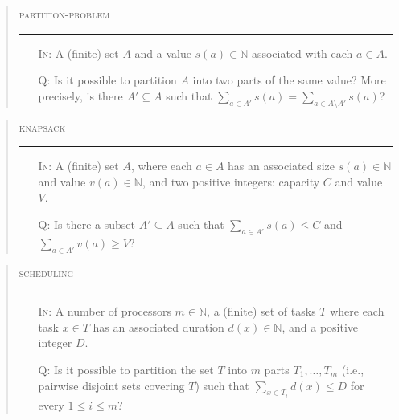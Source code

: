 \documentclass[a4paper,12pt]{amsart}
\begin{document}
        \bigskip
        \begin{quote}
        \begin{mdframed}
        \textsc{partition-problem}
        \medskip\hrule\medskip
        \begin{itemize}
            \item[\textsc{In:}] A (finite) set $A$ and a value $s(a)\in\mathbb N$ associated with each $a\in A$.
            \item[\textsc{Q:}] Is it possible to partition $A$ into two parts of the same value? More precisely, is there $A'\subseteq A$ such that $\sum_{a\in A'} s(a)=\sum_{a\in A\setminus A'} s(a)$?
        \end{itemize}
        \end{mdframed}
        \end{quote}
        
        
        \bigskip
        \begin{quote}
        \begin{mdframed}
        \textsc{knapsack}
        \medskip\hrule\medskip
        \begin{itemize}
            \item[\textsc{In:}] A (finite) set $A$, where each $a\in A$ has an associated size $s(a)\in\mathbb N$ and value $v(a)\in\mathbb N$, and two positive integers: capacity $C$ and value $V$.
            \item[\textsc{Q:}] Is there a subset $A'\subseteq A$ such that $\sum_{a\in A'} s(a)\leq C$ and $\sum_{a\in A'} v(a)\geq V$?
        \end{itemize}
        \end{mdframed}
        \end{quote}
        
        
        \bigskip
        \begin{quote}
        \begin{mdframed}
        \textsc{scheduling}
        \medskip\hrule\medskip
        \begin{itemize}
            \item[\textsc{In:}] A number of processors $m\in\mathbb N$, a (finite) set of tasks $T$ where each task $x\in T$ has an associated duration $d(x)\in\mathbb N$, and a positive integer $D$.
            \item[\textsc{Q:}] Is it possible to partition the set $T$ into $m$ parts $T_1,\dots,T_m$ (i.e., pairwise disjoint sets covering $T$) such that $\sum_{x\in T_i} d(x)\leq D$ for every $1\leq i\leq m$?
        \end{itemize}
        \end{mdframed}
        \end{quote}
        
\end{document}
